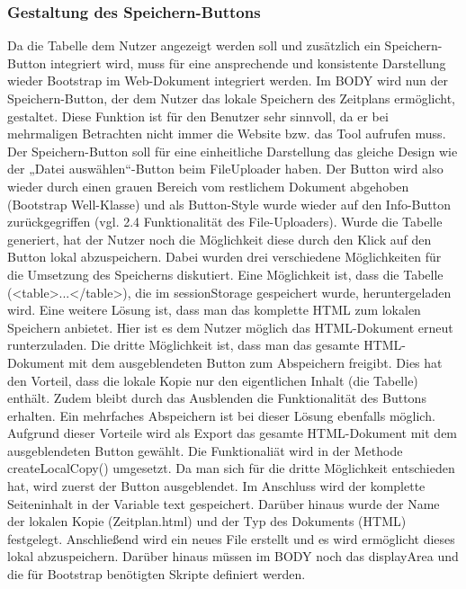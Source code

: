 {\subsubsection{Gestaltung des Speichern-Buttons}
Da die Tabelle dem Nutzer angezeigt werden soll und zusätzlich ein Speichern-Button integriert wird, muss für eine ansprechende und konsistente Darstellung wieder Bootstrap im Web-Dokument integriert werden. Im BODY wird nun der Speichern-Button, der dem Nutzer das lokale Speichern des Zeitplans ermöglicht, gestaltet. Diese Funktion ist für den Benutzer sehr sinnvoll, da er bei mehrmaligen Betrachten nicht immer die Website bzw. das Tool aufrufen muss. Der Speichern-Button soll für eine einheitliche Darstellung das gleiche Design wie der „Datei auswählen“-Button beim FileUploader haben. Der Button wird also wieder durch einen grauen Bereich vom restlichem Dokument abgehoben (Bootstrap Well-Klasse) und als Button-Style wurde wieder auf den Info-Button zurückgegriffen (vgl. 2.4 Funktionalität des File-Uploaders).
Wurde die Tabelle generiert, hat der Nutzer noch die Möglichkeit diese durch den Klick auf den Button lokal abzuspeichern. Dabei wurden drei verschiedene Möglichkeiten für die Umsetzung des Speicherns diskutiert. Eine Möglichkeit ist, dass die Tabelle (<table>...</table>), die im sessionStorage gespeichert wurde, heruntergeladen wird. Eine weitere Lösung ist, dass man das komplette HTML zum lokalen Speichern anbietet. Hier ist es dem Nutzer möglich das HTML-Dokument erneut runterzuladen. Die dritte Möglichkeit ist, dass man das gesamte HTML-Dokument mit dem ausgeblendeten Button zum Abspeichern freigibt. Dies hat den Vorteil, dass die lokale Kopie nur den eigentlichen Inhalt (die Tabelle) enthält. Zudem bleibt durch das Ausblenden die Funktionalität des Buttons erhalten. Ein mehrfaches Abspeichern ist bei dieser Lösung ebenfalls möglich. Aufgrund dieser Vorteile wird als Export das gesamte HTML-Dokument mit dem ausgeblendeten Button gewählt. 
Die Funktionaliät wird in der Methode createLocalCopy() umgesetzt. Da man sich für die dritte Möglichkeit entschieden hat, wird zuerst der Button ausgeblendet. Im Anschluss wird der komplette Seiteninhalt in der Variable text gespeichert. Darüber hinaus wurde der Name der lokalen Kopie (Zeitplan.html) und der Typ des Dokuments (HTML) festgelegt. Anschließend wird ein neues File erstellt und es wird ermöglicht dieses lokal abzuspeichern.
Darüber hinaus müssen im BODY noch das displayArea und die für Bootstrap benötigten Skripte definiert werden.

}
